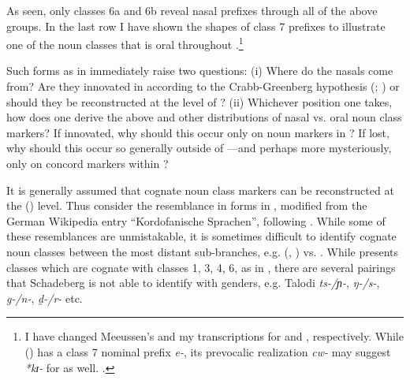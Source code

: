 \documentclass[output=paper]{langsci/langscibook}
\begin{document}
\noindent
As seen, only classes 6a and 6b reveal nasal prefixes through all of the above groups. In the last row I have shown the shapes of class 7 prefixes to illustrate one of the noun classes that is oral throughout .\footnote{I have changed Meeussen’s and my transcriptions for  and , respectively. While  () has a class 7 nominal prefix \textit{e-}, its prevocalic realization \textit{cw-} may suggest \textit{*kɪ-} for  as well. \citep{Voorhoeve1980kenyang}.} 

Such forms as in  immediately raise two questions: (i) Where do the nasals come from? Are they innovated in  according to the Crabb-Green\-berg hypothesis (\citealt{Crabb1965}; \citealt{Greenberg1963}) or should they be reconstructed at the level of  \citep{Miehe1991}? (ii) Whichever position one takes, how does one derive the above and other distributions of nasal vs. oral noun class markers? If innovated, why should this occur only on noun markers in ? If lost, why should this occur so generally outside of —and perhaps more mysteriously, only on concord markers within ?

It is generally assumed that cognate noun class markers can be reconstructed at the  () level. Thus consider the resemblance in forms in , modified from the German Wikipedia entry “Kordofanische Sprachen”, following \citet{Schadeberg1981,Schadeberg2011}. While some of these resemblances are unmistakable, it is sometimes difficult to identify cognate noun classes between the most distant sub-branches, e.g.  (, ) vs.  \citep[96]{Wilson1989}. While \citet{Schadeberg2011} presents  classes which are cognate with  classes 1, 3, 4, 6, as in , there are several  pairings that Schadeberg is not able to identify with  genders, e.g. Talodi \textit{ts-/ɲ-}, \textit{ŋ-/s-}, \textit{g-/n-}, \textit{d̯-/r-} etc.
\end{document}
